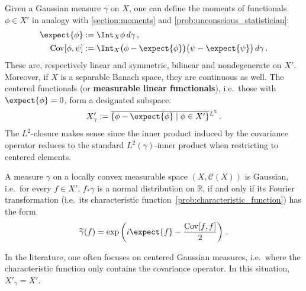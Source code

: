     Given a Gaussian measure $\gamma$ on $X$, one can define the moments of functionals $\phi\in X'$ in analogy with \cref{section:moments} and \cref{prob:unconscious_statistician}:
    \begin{gather}
        \begin{aligned}
            \expect{\phi} &:= \Int_X\phi\,d\gamma\,,\\
            \mathrm{Cov}[\phi,\psi] &:= \Int_X\bigl(\phi-\expect{\phi}\bigr)\bigl(\psi-\expect{\psi}\bigr)\,d\gamma\,.
        \end{aligned}
    \end{gather}
    These are, respectively linear and symmetric, bilinear and nondegenerate on $X'$. Moreover, if $X$ is a separable Banach space, they are continuous as well. The centered functionals (or \textbf{measurable linear functionals}), i.e.~those with $\expect{\phi}=0$, form a designated subspace:
    \begin{gather}
        X'_\gamma := \overline{\{\phi-\expect{\phi}\mid\phi\in X'\}}\vphantom{\expect{\phi}}^{L^2}\,.
    \end{gather}
    The $L^2$-closure makes sense since the inner product induced by the covariance operator reduces to the standard $L^2(\gamma)$-inner product when restricting to centered elements.

    \begin{theorem}
        A measure $\gamma$ on a locally convex measurable space $(X,\mathcal{C}(X))$ is Gaussian, i.e.~for every $f\in X'$, $f_*\gamma$ is a normal distribution on $\mathbb{R}$, if and only if its Fourier transformation (i.e.~its characteristic function~\ref{prob:characteristic_function}) has the form
        \begin{gather}
            \widetilde{\gamma}(f) = \exp\left(i\expect{f} - \frac{\mathrm{Cov}[f,f]}{2}\right)\,.
        \end{gather}
    \end{theorem}
    \begin{remark}
        In the literature, one often focuses on centered Gaussian measures, i.e.~where the characteristic function only contains the covariance operator. In this situation, $X'_\gamma=X'$.
    \end{remark}


